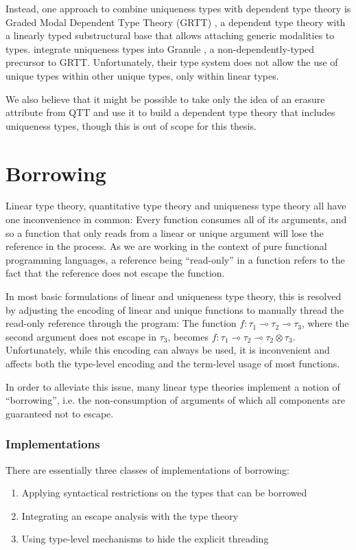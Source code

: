 Instead, one approach to combine uniqueness types with dependent type theory is Graded Modal Dependent Type Theory (GRTT) \citep{moon_graded_2021}, a dependent type theory with a linearly typed substructural base that allows attaching generic modalities to types. \cite{sergey_linearity_2022} integrate uniqueness types into Granule \citep{orchard_quantitative_2019}, a non-dependently-typed precursor to GRTT. Unfortunately, their type system does not allow the use of unique types within other unique types, only within linear types. 

We also believe that it might be possible to take only the idea of an erasure attribute from QTT and use it to build a dependent type theory that includes uniqueness types, though this is out of scope for this thesis.

\section{Borrowing}\label{sec:borrowingbackground}
Linear type theory, quantitative type theory and uniqueness type theory all have one inconvenience in common: Every function consumes all of its arguments, and so a function that only reads from a linear or unique argument will lose the reference in the process. As we are working in the context of pure functional programming languages, a reference being ``read-only'' in a function refers to the fact that the reference does not escape the function.

In most basic formulations of linear and uniqueness type theory, this is resolved by adjusting the encoding of linear and unique functions to manually thread the read-only reference through the program: The function $f : \tau_1 \multimap \tau_2 \multimap \tau_3$, where the second argument does not escape in $\tau_3$, becomes $f : \tau_1 \multimap \tau_2 \multimap \tau_2 \otimes \tau_3$. Unfortunately, while this encoding can always be used, it is inconvenient and affects both the type-level encoding and the term-level usage of most functions. 

In order to alleviate this issue, many linear type theories implement a notion of ``borrowing'', i.e. the non-consumption of arguments of which all components are guaranteed not to escape. 

\subsubsection{Implementations}
There are essentially three classes of implementations of borrowing:
\begin{enumerate}
	\item Applying syntactical restrictions on the types that can be borrowed \citep{wadler_linear_1990}
	\item Integrating an escape analysis with the type theory \citep{goos_observers_1992}\citep{kobayashi_quasi-linear_1999}\citep{goos_another_2002}
	\item Using type-level mechanisms to hide the explicit threading \citep{spiwack_linearly_2022}
\end{enumerate}

